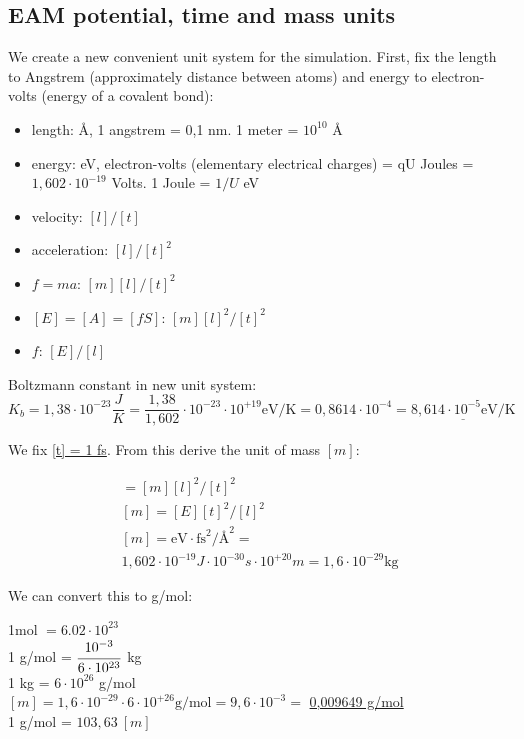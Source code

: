 \documentclass[12pt,a4paper]{article}
\begin{document}
\subsection*{EAM potential, time and mass units}

We create a new convenient unit system for the simulation. First, fix the length to Angstrem (approximately distance between atoms) and energy to electron-volts (energy of a covalent bond):

\begin{itemize}
	\item length: Å, 1 angstrem = 0,1 nm. 1 meter = $10^{10}$ Å
	\item energy: eV, electron-volts (elementary electrical charges) = qU Joules = $1,602 \cdot 10^{-19}$ Volts. 1 Joule = $1/U$ eV
	\item velocity: $[l]/[t]$
	\item acceleration: $[l]/[t]^2$
	\item $f=ma$:       $[m][l]/[t]^2$
	\item $[E]=[A]=[fS]$:    $[m][l]^2/[t]^2$
	\item $f$: $[E]/[l]$
\end{itemize}

Boltzmann constant in new unit system: \[ K_b = 1,38 \cdot 10^{-23} \frac{J}{K} = \frac{1,38}{1,602} \cdot 10^{-23} \cdot 10^{+19} \text{eV/K} = 0,8614 \cdot 10^{-4} = \underline{8,614 \cdot 10^{-5} \text{eV/K}} \]

We fix \underline{[t] = 1 fs}. From this derive the unit of mass $[m]$: 

\begin{gather*}
	[E] = [m][l]^2/[t]^2\\
	[m] = [E][t]^2/[l]^2\\
	[m] = \text{eV} \cdot \text{fs}^2 / \text{Å}^2 =\\
	1,602 \cdot 10^{-19} J \cdot 10^{-30} s \cdot 10^{+20} m = 1,6 \cdot 10^{-29} \text{kg}
\end{gather*}

We can convert this to g/mol:
\begin{center}
	1mol $= 6.02 \cdot 10^{23}$\\
	1 g/mol = $\cfrac{10^{-3}}{6 \cdot 10^{23}}$ kg\\
	1 kg = $6 \cdot 10^{26}$ g/mol\\
	$[m] = 1,6 \cdot 10^{-29} \cdot 6 \cdot 10^{+26} \text{g/mol} = 9,6 \cdot 10^{-3} =$ \underline{0,009649 g/mol}\\
	1 g/mol = $103,63\ [m]$
\end{center}
\end{document}
